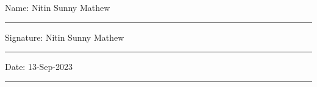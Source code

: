 \documentclass[11pt,oneside]{book}
\begin{document}
\noindent Name: Nitin Sunny Mathew\\[1mm]
\rule[1em]{25em}{0.5pt}

\noindent Signature: Nitin Sunny Mathew\\[1mm]
\rule[1em]{25em}{0.5pt}

\noindent Date: 13-Sep-2023\\[1mm]
\rule[1em]{25em}{0.5pt}



\tableofcontents
\listoffigures
\listoftables


\mainmatter









 
 

\begin{appendices}


\end{appendices}
\end{document}
